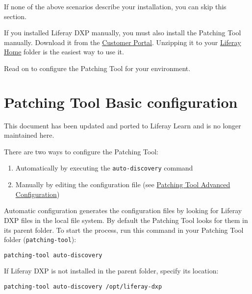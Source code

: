 If none of the above scenarios describe your installation, you can skip
this section.

If you installed Liferay DXP manually, you must also install the
Patching Tool manually. Download it from the
\href{https://customer.liferay.com/downloads?p_p_id=com_liferay_osb_customer_downloads_display_web_DownloadsDisplayPortlet&_com_liferay_osb_customer_downloads_display_web_DownloadsDisplayPortlet_productAssetCategoryId=118191019&_com_liferay_osb_customer_downloads_display_web_DownloadsDisplayPortlet_fileTypeAssetCategoryId=118191066}{Customer
Portal}. Unzipping it to your
\href{/docs/7-2/deploy/-/knowledge_base/d/liferay-home}{Liferay Home}
folder is the easiest way to use it.

Read on to configure the Patching Tool for your environment.

\chapter{Patching Tool Basic
configuration}\label{patching-tool-basic-configuration}

{This document has been updated and ported to Liferay Learn and is no
longer maintained here.}

There are two ways to configure the Patching Tool:

\begin{enumerate}
\def\labelenumi{\arabic{enumi}.}
\item
  Automatically by executing the \texttt{auto-discovery} command
\item
  Manually by editing the configuration file (see
  \href{/docs/7-2/deploy/-/knowledge_base/d/patching-tool-advanced-configuration}{Patching
  Tool Advanced Configuration})
\end{enumerate}

Automatic configuration generates the configuration files by looking for
Liferay DXP files in the local file system. By default the Patching Tool
looks for them in its parent folder. To start the process, run this
command in your Patching Tool folder (\texttt{patching-tool}):

\begin{verbatim}
patching-tool auto-discovery
\end{verbatim}

If Liferay DXP is not installed in the parent folder, specify its
location:

\begin{verbatim}
patching-tool auto-discovery /opt/liferay-dxp
\end{verbatim}

